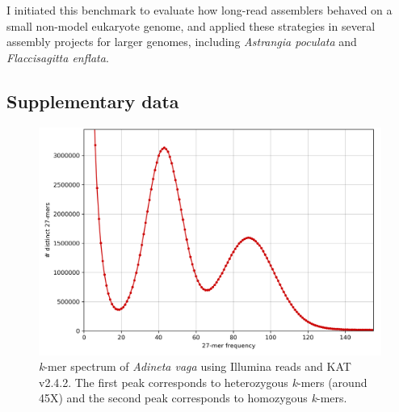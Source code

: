 I initiated this benchmark to evaluate how long-read assemblers behaved on a small non-model eukaryote genome, and applied these strategies in several assembly projects for larger genomes, including \textit{Astrangia poculata} and \textit{Flaccisagitta enflata}. \\



\begin{suppsection}

\beginsupplement

\section*{Supplementary data}

   \begin{figure}[ht]
    \centering
     \includegraphics[width=13.5cm]{fig/benchmark/avaga_lab_kat.hist.png}
   \caption{\textit{k}-mer spectrum of \textit{Adineta vaga} using Illumina reads and KAT v2.4.2. The first peak corresponds to heterozygous \textit{k}-mers (around 45X) and the second peak corresponds to homozygous \textit{k}-mers.}
   \label{fig:kmer_spectrum}
 \end{figure}


\end{suppsection}
